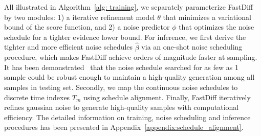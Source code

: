 All illustrated in Algorithm~\ref{alg: training}, we separately parameterize FastDiff by two modules: 1) a iterative refinement model $\theta$ that minimizes a variational bound of the score function, and 2) a noise predictor $\phi$ that optimizes the noise schedule for a tighter evidence lower bound. For inference, we first derive the tighter and more efficient noise schedules $\hat{\beta}$ via an one-shot noise scheduling procedure, which makes FastDiff achieve orders of magnitude faster at sampling. It has been demonstrated~\cite{lam2022bddm} that the noise schedule searched for as few as 1 sample could be robust enough to maintain a high-quality generation among all samples in testing set. Secondly, we map the continuous noise schedules to discrete time indexes $T_m$ using schedule alignment. Finally, FastDiff iteratively refines gaussian noise to generate high-quality samples with computational efficiency. The detailed information on training, noise scheduling and inference procedures has been presented in Appendix~\ref{appendix:schedule_alignment}.

